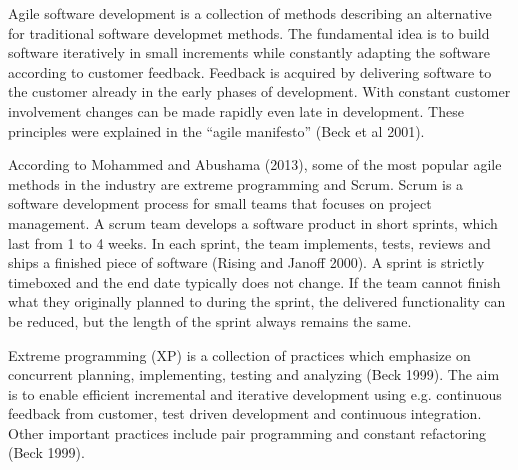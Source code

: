 Agile software development is a collection of methods describing an
alternative for traditional software developmet methods. The fundamental
idea is to build software iteratively in small increments while
constantly adapting the software according to customer feedback.
Feedback is acquired by delivering software to the customer already in
the early phases of development. With constant customer involvement
changes can be made rapidly even late in development. These principles were
explained in the ``agile manifesto'' (Beck et al 2001).

According to Mohammed and Abushama (2013), some of the most popular
agile methods in the industry are extreme programming and Scrum.
Scrum is a software development process for small teams that focuses
on project management. A scrum team develops a software product in
short sprints, which last from 1 to 4 weeks. In each sprint, the team
implements, tests, reviews and ships a finished piece of software
(Rising and Janoff 2000). A sprint is strictly timeboxed and the end
date typically does not change. If the team cannot finish what they
originally planned to during the sprint, the delivered functionality can
be reduced, but the length of the sprint always remains the same.

Extreme programming (XP) is a collection of practices which emphasize
on concurrent planning, implementing, testing and analyzing (Beck 1999). The
aim is to enable efficient incremental and iterative development
using e.g. continuous feedback from customer, test driven development
and continuous integration. Other important practices include pair
programming and constant refactoring (Beck 1999).
